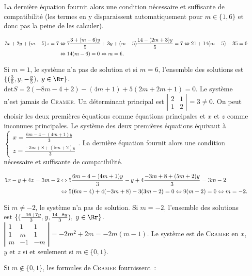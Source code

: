 {{La dernière équation fournit alors une condition nécessaire et suffisante de compatibilité (les termes en y disparaissent automatiquement pour $m\in\{1,6\}$ et donc pas la peine de les calculer).

\begin{align*}\ensuremath
7x+2y+(m-5)z=7&\Leftrightarrow7\frac{3+(m-6)y}{5}+3y+(m-5)\frac{14-(2m+3)y}{5}=7\Leftrightarrow 21+14(m-5)-35=0\\
 &\Leftrightarrow 14(m-6)= 0\Leftrightarrow m = 6.
\end{align*}

Si $m=1$, le système n'a pas de solution et si $m=6$, l'ensemble des solutions est $\{(\frac{3}{5},y,-\frac{y}{5}),\;y\in\Rr\}$.
$\mbox{det}S=2(-8m-4+2)-(4m+1)+5(2m+2m+1)=0$. Le système n'est jamais de \textsc{Cramer}. Un déterminant principal est $\left|
\begin{array}{cc}
2&1\\
1&2
\end{array}
\right|=3\neq 0$. On peut choisir les deux premières équations comme équations principales et $x$ et $z$ comme inconnues principales. Le système des deux premières équations équivaut à $\left\{
\begin{array}{l}
x=\frac{6m-4-(4m+1)y}{3}\\
z=\frac{-3m+8+(5m+2)y}{3}
\end{array}
\right.$. La dernière équation fournit alors une condition nécessaire et suffisante de compatibilité.

\begin{align*}\ensuremath
5x-y+4z=3m-2&\Leftrightarrow5\frac{6m-4-(4m+1)y}{3}-y+4\frac{-3m+8+(5m+2)y}{3}=3m-2\\
 &\Leftrightarrow5(6m-4)+4(-3m+8)-3(3m-2)=0\Leftrightarrow9(m+2)=0\Leftrightarrow m=-2.
\end{align*}

Si $m\neq-2$, le système n'a pas de solution. Si $m=-2$, l'ensemble des solutions est $\{(\frac{-16+7y}{3},y,\frac{14-8y}{3}),\;y\in\Rr\}$.
$\left|
\begin{array}{ccc}
1&1&1\\
1&m&1\\
m&-1&-m
\end{array}\right|=-2m^2+2m=-2m(m-1)$. Le système est de \textsc{Cramer} en $x$, $y$ et $z$ si et seulement si $m\in\{0,1\}$.

Si $m\notin\{0,1\}$, les formules de \textsc{Cramer} fournissent~:

}}
